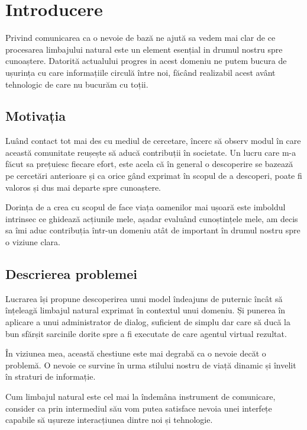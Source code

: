 \chapter{Introducere}

Privind comunicarea ca o nevoie de bază ne ajută sa vedem mai clar de ce procesarea limbajului natural este un element esențial in drumul nostru spre cunoaștere. Datorită actualului progres in acest domeniu ne putem bucura de ușurința cu care informațiile circulă între noi, făcând realizabil acest avânt tehnologic de care nu bucurăm cu toții.

\section{Motivația}

Luând contact tot mai des cu mediul de cercetare, încerc să observ modul în care această comunitate reușește să aducă contribuții în societate. Un lucru care m-a făcut sa prețuiesc fiecare efort, este acela că în general o descoperire se bazează pe cercetări anterioare și ca orice gând exprimat în scopul de a descoperi, poate fi valoros și dus mai departe spre cunoaștere.

Dorința de a crea cu scopul de face viața oamenilor mai ușoară este imboldul intrinsec ce ghidează acțiunile mele, așadar evaluând cunoștințele mele, am decis sa îmi aduc contribuția într-un domeniu atât de important în drumul nostru spre o viziune clara.

\section{Descrierea problemei}

Lucrarea își propune descoperirea unui model îndeajuns de puternic încât să înțeleagă limbajul natural exprimat în contextul unui domeniu. Și punerea în aplicare a unui administrator de dialog, suficient de simplu dar care să ducă la bun sfărșit sarcinile dorite spre a fi executate de care agentul virtual rezultat.

În viziunea mea, această chestiune este mai degrabă ca o nevoie decăt o problemă. O nevoie ce survine în urma stilului nostru de viață dinamic și învelit în straturi de informație.

Cum limbajul natural este cel mai la îndemâna instrument de comunicare, consider ca prin intermediul său vom putea satisface nevoia unei interfețe capabile să ușureze interacțiunea dintre noi și tehnologie.

